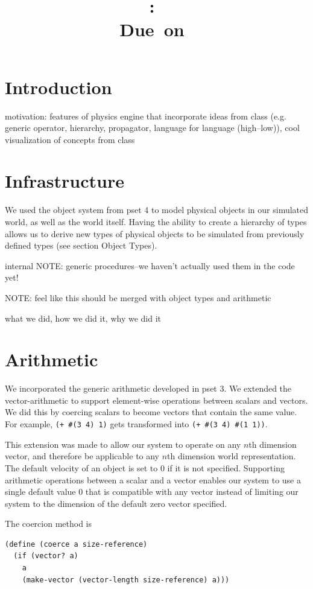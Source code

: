 \documentclass{article}
\title{
    \textmd{\hmwkClass:\ \hmwkTitle}\\
    \small{Due\ on\ \hmwkDueDate}
}
\author{\hmwkAuthorName}
\date{}
\begin{document}
\maketitle
\section{Introduction}

motivation: features of physics engine that incorporate ideas from class (e.g.
generic operator, hierarchy, propagator, language for language (high--low)),
cool visualization of concepts from class

\section{Infrastructure}
We used the object system from pset 4 to model physical objects in our simulated world, as well as the world itself. Having the ability to create a hierarchy of types allows us to derive new types of physical objects to be simulated from previously defined types (see section Object Types).

internal NOTE: generic procedures--we haven't actually used them in the code yet!

NOTE: feel like this should be merged with object types and arithmetic

what we did, how we did it, why we did it

\section{Arithmetic}

We incorporated the generic arithmetic developed in pset 3. We extended the
vector-arithmetic to support element-wise operations between scalars and
vectors. We did this by coercing scalars to become vectors that contain the
same value. For example, \texttt{(+ \#(3 4) 1)} gets transformed into
\texttt{(+ \#(3 4) \#(1 1))}. 

This extension was made to allow our system to operate on any $n$th dimension
vector, and therefore be applicable to any $n$th dimension world
representation. The default velocity of an object is set to 0 if it is not
specified. Supporting arithmetic operations between a scalar and a vector
enables our system to use a single default value 0 that is compatible with any
vector instead of limiting our system to the dimension of the default zero
vector specified.  

The coercion method is 
\begin{verbatim}
(define (coerce a size-reference)
  (if (vector? a)
    a
    (make-vector (vector-length size-reference) a)))
\end{verbatim}
\end{document}
